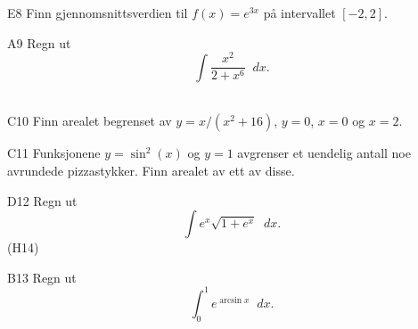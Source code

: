 \documentclass[a4paper,norsk,11pt]{interaktiv}
\newcommand{\dee}{\mathop{}\!{d}}
\begin{document}
\begin{oppgave}{E8}
  Finn gjennomsnittsverdien til $f(x) = e^{3x}$ på intervallet
  $[-2,2]$.
  \\[-6pt]
\end{oppgave}

\begin{oppgave}{A9}
  Regn ut
  \begin{equation*}
    \int \frac{x^2}{2+x^6} \dee x.
  \end{equation*}
  \\[-6pt]
\end{oppgave}

\begin{oppgave}{C10}
  Finn arealet begrenset av $y = x/(x^2 + 16)$, $y = 0$, $x = 0$ og $x
  = 2$.
  \\[-6pt]
\end{oppgave}

\begin{oppgave}{C11}
  Funksjonene $ y =\sin^2(x)$ og $y=1$ avgrenser et uendelig antall
  noe avrundede pizzastykker. Finn arealet av ett av disse.
  \\[-6pt]
\end{oppgave}

\begin{oppgave}{D12}
  Regn ut
  \begin{equation*}
    \int e^x \sqrt{1+e^x}\dee x.
  \end{equation*}
  (H14)
  \\[-6pt]
\end{oppgave}

\begin{oppgave}{B13}
  Regn ut
  \begin{equation*}
    \int_0^1 e^{\arcsin x} \dee x.
  \end{equation*}
\end{oppgave}
\end{document}
